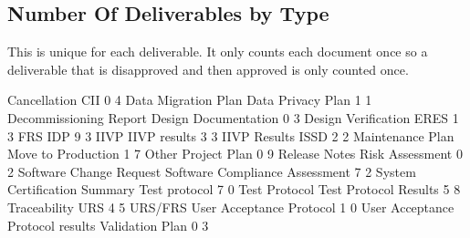 \documentclass{article}
\begin{document}
\subsection{Number Of Deliverables by Type}
This is unique for each deliverable. It only counts each document once so a deliverable
that is disapproved and then approved is only counted once.

\begin{Schunk}
\begin{Soutput}
                    Cancellation                              CII 
                               0                                4 
             Data Migration Plan                Data Privacy Plan 
                               1                                1 
          Decommissioning Report             Design Documentation 
                               0                                3 
             Design Verification                             ERES 
                               1                                3 
                             FRS                              IDP 
                               9                                3 
                            IIVP                     IIVP results 
                               3                                3 
                    IIVP Results                             ISSD 
                               2                                2 
                Maintenance Plan               Move to Production 
                               1                                7 
                           Other                     Project Plan 
                               0                                9 
                   Release Notes                  Risk Assessment 
                               0                                2 
         Software Change Request   Software Compliance Assessment 
                               7                                2 
    System Certification Summary                    Test protocol 
                               7                                0 
                   Test Protocol            Test Protocol Results 
                               5                                8 
                    Traceability                              URS 
                               4                                5 
                         URS/FRS         User Acceptance Protocol 
                               1                                0 
User Acceptance Protocol results                  Validation Plan 
                               0                                3 
\end{Soutput}
\end{Schunk}
\end{document}
